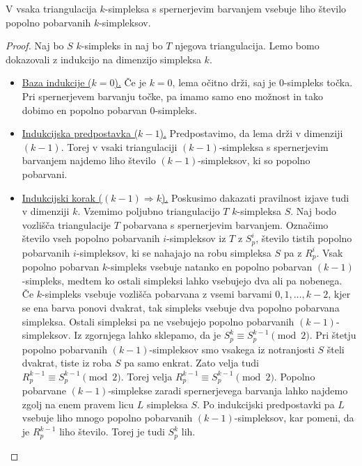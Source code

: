 \documentclass[mat1]{fmfdelo}
\newcommand{\0}{\underline{0}}
\begin{document}
\begin{lema}\label{izr:sperner}
V vsaka triangulacija $k$-simpleksa s spernerjevim barvanjem vsebuje liho število popolno pobarvanih $k$-simpleksov.
\end{lema}
\begin{proof}
Naj bo $S$ $k$-simpleks in naj bo $T$ njegova triangulacija. Lemo bomo dokazovali z indukcijo na dimenzijo simpleksa $k$. 
\begin{itemize}
\item
\underline{Baza indukcije ($k = 0$).}
Če je $k=0$, lema očitno drži, saj je $0$-simpleks točka. Pri spernerjevem barvanju točke, pa imamo samo eno možnost in tako dobimo en popolno pobarvan $0$-simpleks.
\item
\underline{Indukcijska predpostavka ($k - 1$).}
Predpostavimo, da lema drži v dimenziji $(k - 1)$. Torej v vsaki triangulaciji $(k - 1)$-simpleksa s spernerjevim barvanjem najdemo liho število $(k - 1)$-simpleksov, ki so popolno pobarvani. 
\item
\underline{Indukcijski korak ($(k - 1) \Longrightarrow k$).}
Poskusimo dakazati pravilnost izjave tudi v dimenziji $k$. Vzemimo poljubno triangulacijo $T$ $k$-simpleksa $S$. Naj bodo vozlišča triangulacije $T$ pobarvana s spernerjevim barvanjem. Označimo število vseh popolno pobarvanih $i$-simpleksov iz $T$ z $S_p^i$, število tistih popolno pobarvanih $i$-simpleksov, ki se nahajajo na robu simpleksa $S$ pa z $R_p^i$. Vsak popolno pobarvan $k$-simpleks vsebuje natanko en popolno pobarvan $(k-1)$-simpleks, medtem ko ostali simpleksi lahko vsebujejo dva ali pa nobenega. Če $k$-simpleks vsebuje vozlišča pobarvana z vsemi barvami $0, 1, \dots, k-2$, kjer se ena barva ponovi dvakrat, tak simpleks vsebuje dva popolno pobarvana simpleksa. Ostali simpleksi pa ne vsebujejo popolno pobarvanih $(k - 1)$-simpleksov. Iz zgornjega lahko sklepamo, da je $S_p^k \equiv S_p^{k-1} \pmod 2$. Pri štetju popolno pobarvanih $(k - 1)$-simpleksov smo vsakega iz notranjosti $S$ šteli dvakrat, tiste iz roba $S$ pa samo enkrat. Zato velja tudi $R_p^{k - 1} \equiv S_p^{k-1} \pmod 2$. Torej velja $R_p^{k - 1} \equiv S_p^{k-1} \pmod 2$. Popolno pobarvane $(k - 1)$-simplekse zaradi spernerjevega barvanja lahko najdemo zgolj na enem pravem licu $L$ simpleksa $S$. Po indukcijski predpostavki pa $L$ vsebuje liho mnogo popolno pobarvanih $(k - 1)$-simpleksov, kar pomeni, da je $R_p^{k - 1}$ liho število. Torej je tudi  $S_p^k$ lih.
\end{itemize}
\end{proof}
\end{document}

